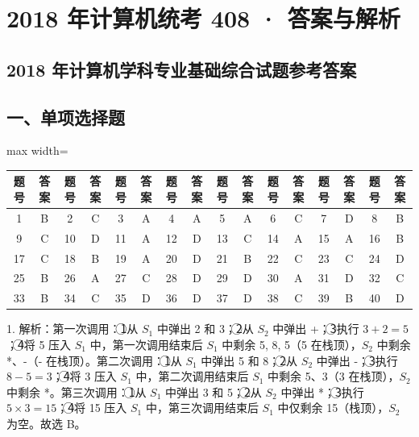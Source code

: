 \documentclass[UTF8,11pt]{ctexart}
\begin{document}
\section*{2018 年计算机统考 408 · 答案与解析}
\subsection*{2018 年计算机学科专业基础综合试题参考答案}

\subsection*{一、单项选择题}

\begin{center}\begin{adjustbox}{max width=\linewidth}\begin{tabular}{|c|c|c|c|c|c|c|c|c|c|c|c|c|c|c|c|}\hline
题号 & 答案 & 题号 & 答案 & 题号 & 答案 & 题号 & 答案 & 题号 & 答案 & 题号 & 答案 & 题号 & 答案 & 题号 & 答案\\\hline
1 & B & 2 & C & 3 & A & 4 & A & 5 & A & 6 & C & 7 & D & 8 & B\\\hline
9 & C & 10 & D & 11 & A & 12 & D & 13 & C & 14 & A & 15 & A & 16 & B\\\hline
17 & C & 18 & B & 19 & A & 20 & D & 21 & B & 22 & C & 23 & C & 24 & D\\\hline
25 & B & 26 & A & 27 & C & 28 & D & 29 & D & 30 & A & 31 & D & 32 & C\\\hline
33 & B & 34 & C & 35 & D & 36 & D & 37 & D & 38 & C & 39 & B & 40 & D\\\hline\end{tabular}\end{adjustbox}\end{center}

1. 解析：第一次调用：\textcircled{1}从 \(\displaystyle S_1\) 中弹出 2 和 3；\textcircled{2}从 \(\displaystyle S_2\) 中弹出 +；\textcircled{3}执行 \(\displaystyle 3+2=5\)；\textcircled{4}将 5 压入 \(\displaystyle S_1\) 中，第一次调用结束后 \(\displaystyle S_1\) 中剩余 5, 8, 5（5 在栈顶），\(\displaystyle S_2\) 中剩余 *、-（- 在栈顶）。第二次调用：\textcircled{1}从 \(\displaystyle S_1\) 中弹出 5 和 8；\textcircled{2}从 \(\displaystyle S_2\) 中弹出 -；\textcircled{3}执行 \(\displaystyle 8-5=3\)；\textcircled{4}将 3 压入 \(\displaystyle S_1\) 中，第二次调用结束后 \(\displaystyle S_1\) 中剩余 5、3（3 在栈顶），\(\displaystyle S_2\) 中剩余 *。第三次调用：\textcircled{1}从 \(\displaystyle S_1\) 中弹出 3 和 5；\textcircled{2}从 \(\displaystyle S_2\) 中弹出 *；\textcircled{3}执行 \(\displaystyle 5\times3=15\)；\textcircled{4}将 15 压入 \(\displaystyle S_1\) 中，第三次调用结束后 \(\displaystyle S_1\) 中仅剩余 15（栈顶），\(\displaystyle S_2\) 为空。故选 B。
\end{document}
